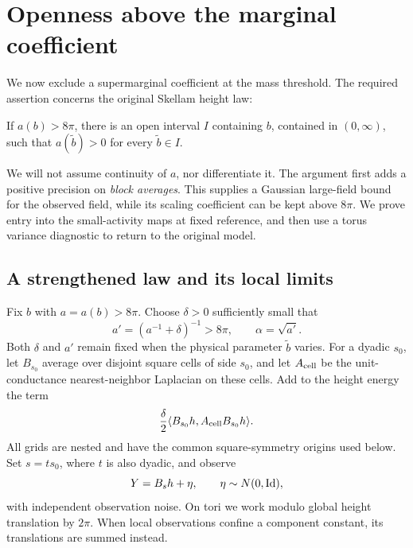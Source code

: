 \section{Openness above the marginal coefficient}\label{sec:openness}

We now exclude a supermarginal coefficient at the mass threshold.
The required assertion concerns the original Skellam height law:
\begin{proposition}\label{prop:openness}
If \(a(b)>8\pi\), there is an open interval \(I\) containing \(b\),
contained in \((0,\infty)\), such that \(a(\widetilde b)>0\) for
every \(\widetilde b\in I\).
\end{proposition}
We will not assume continuity of \(a\), nor differentiate it.  The
argument first adds a positive precision on \emph{block averages}.
This supplies a Gaussian large-field bound for the observed field,
while its scaling coefficient can be kept above \(8\pi\).
We prove entry into the small-activity maps at fixed reference, and
then use a torus variance diagnostic to return to the original model.

\subsection{A strengthened law and its local limits}

Fix \(b\) with \(a=a(b)>8\pi\).  Choose \(\delta>0\) sufficiently small
that
\begin{equation}\label{eq:op-reference}
 a'=(a^{-1}+\delta)^{-1}>8\pi,\qquad \alpha=\sqrt{a'}.
\end{equation}
Both \(\delta\) and \(a'\) remain fixed when the physical parameter
\(\widetilde b\) varies.  For a dyadic \(s_0\), let \(B_{s_0}\) average
over disjoint square cells of side \(s_0\), and let \(A_{\rm cell}\)
be the unit-conductance nearest-neighbor Laplacian on these cells.
Add to the height energy the term
\begin{equation}\label{eq:op-added-precision}
 \frac{\delta}{2}\langle B_{s_0}h,A_{\rm cell}B_{s_0}h\rangle.
\end{equation}
All grids are nested and have the common square-symmetry origins
used below.  Set \(s=ts_0\), where \(t\) is also dyadic, and observe
\begin{equation}\label{eq:op-observation}
 Y=B_sh+\eta,\qquad \eta\sim N(0,\operatorname{Id}),
\end{equation}
with independent observation noise.  On tori we work modulo global
height translation by \(2\pi\).  When local observations confine a
component constant, its translations are summed instead.

